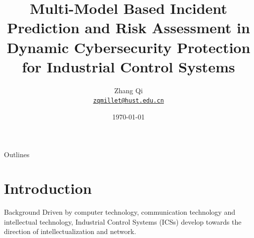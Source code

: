 \documentclass[10pt, compress]{beamer}
\title{Multi-Model Based Incident Prediction and Risk Assessment in Dynamic Cybersecurity Protection for Industrial Control Systems}
\subtitle{}
\date{\today}
\author[Zhang Qi] %
{
  Zhang Qi\\
  \href{mailto:qiqi@hust.edu.cn}{{\tt zqmillet@hust.edu.cn}}
}
\institute{Automation School,\\Huazhong University of Science and Technology,\\Wuhan.}
\begin{document}
\maketitle

\begin{frame}[noframenumbering]{Outlines}
    \tableofcontents %
\end{frame}

\section{Introduction}
\iffalse
\begin{frame}{Background}
    Driven by computer technology, communication technology and intellectual technology, Industrial Control Systems (ICSs) develop towards the direction of intellectualization and network.
    \begin{center}
        
    \end{center}
\end{frame}
\end{document}
